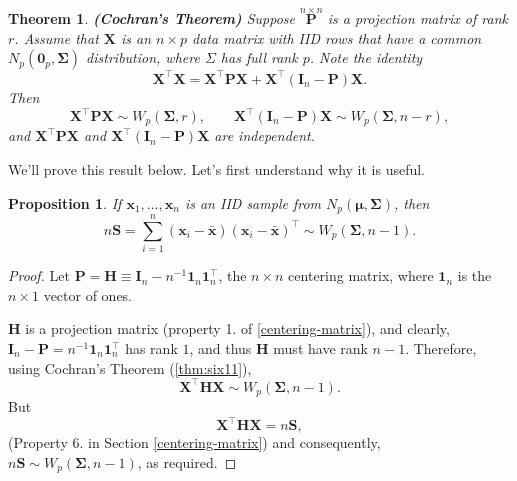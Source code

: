 \documentclass[]{book}
\newtheorem{theorem}{Theorem}[chapter]
\newtheorem{proposition}{Proposition}[chapter]
\theoremstyle{definition}
\theoremstyle{definition}
\theoremstyle{definition}
\theoremstyle{remark}
\begin{document}
\begin{theorem}
\protect\hypertarget{thm:six11}{}{\label{thm:six11} }\textbf{(Cochran's Theorem)} Suppose \(\stackrel{n \times n}{\mathbf P}\) is a projection matrix of rank \(r\). Assume that \(\mathbf X\) is an \(n \times p\) data matrix with IID rows that have a common \(N_p({\mathbf 0}_p, \boldsymbol{\Sigma})\) distribution, where \(\Sigma\) has full rank \(p\). Note the identity
\begin{equation}
\mathbf X^\top \mathbf X= \mathbf X^\top {\mathbf P} \mathbf X+ \mathbf X^\top ({\mathbf I}_n -{\mathbf P})\mathbf X.
\label{eq:Cochran1}
\end{equation}
Then
\begin{equation}
\mathbf X^\top {\mathbf P} \mathbf X\sim W_p(\boldsymbol{\Sigma}, r), \qquad  \mathbf X^\top ({\mathbf I}_n -{\mathbf P})\mathbf X\sim W_p(\boldsymbol{\Sigma}, n-r),
\label{eq:Cochran2}
\end{equation}
and \(\mathbf X^\top {\mathbf P} \mathbf X\) and \(\mathbf X^\top ({\mathbf I}_n -{\mathbf P})\mathbf X\)
are independent.
\end{theorem}

We'll prove this result below. Let's first understand why it is useful.

\begin{proposition}
\protect\hypertarget{prp:six12}{}{\label{prp:six12} }If \(\mathbf x_1,\ldots,\mathbf x_n\) is an IID sample from \(N_p({\boldsymbol{\mu}},\boldsymbol{\Sigma})\), then
\[ n \mathbf S= \sum_{i=1}^n (\mathbf x_i - \bar{\mathbf x})(\mathbf x_i - \bar{\mathbf x})^\top \sim W_p(\boldsymbol{\Sigma},n-1).\]
\end{proposition}

\begin{proof}
{} Let \(\mathbf P= {\mathbf H}\equiv \mathbf I_n - n^{-1}{\mathbf 1}_n {\mathbf 1}_n^\top\), the \(n \times n\) centering matrix, where \({\mathbf 1}_n\) is the \(n \times 1\) vector of ones.

\(\mathbf H\) is a projection matrix (property 1. of \ref{centering-matrix}), and clearly, \(\mathbf I_n - \mathbf P=n^{-1} {\mathbf 1}_n {\mathbf 1}_n^\top\) has rank \(1\), and thus \(\mathbf H\) must have rank \(n-1\). Therefore, using Cochran's Theorem (\ref{thm:six11}),
\[
\mathbf X^\top \mathbf H\mathbf X\sim W_p(\boldsymbol{\Sigma}, n-1).
\]
But\\
\[\mathbf X^\top \mathbf H\mathbf X=n\mathbf S,\]
(Property 6. in Section \ref{centering-matrix})
and consequently, \(n\mathbf S\sim W_p(\boldsymbol{\Sigma}, n-1)\), as required.
\end{proof}
\end{document}
